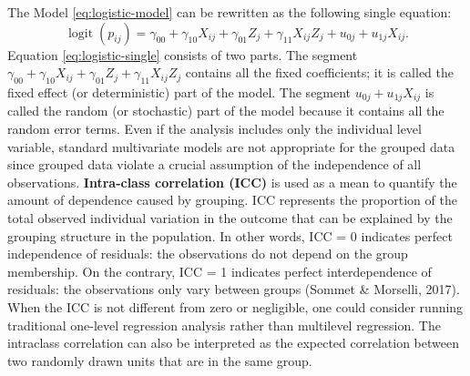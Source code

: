 \documentclass[12pt,oneside,a4paper]{reedthesis}
\begin{document}
The Model \eqref{eq:logistic-model} can be rewritten as the following single equation:
\begin{equation} 
\operatorname{logit}\left(p_{i j}\right)=\gamma_{00}+\gamma_{10} X_{i j}+\gamma_{01} Z_{j}+\gamma_{11} X_{i j} Z_{j}+u_{0 j}+u_{1 j} X_{i j}.
\label{eq:logistic-single}
\end{equation}
Equation \eqref{eq:logistic-single} consists of two parts. The segment \(\gamma_{00}+\gamma_{10} X_{i j}+\gamma_{01} Z_{j}+\gamma_{11} X_{i j} Z_{j}\) contains all the fixed coefficients; it is called the fixed effect (or deterministic) part of the model. The segment \(u_{0 j}+u_{1 j} X_{i j}\) is called the random (or stochastic) part of the model because it contains all the random error terms.
Even if the analysis includes only the individual level variable, standard multivariate models are not appropriate for the grouped data since grouped data violate a crucial assumption of the independence of all observations. \textbf{Intra-class correlation (ICC)} is used as a mean to quantify the amount of dependence caused by grouping. ICC represents the proportion of the total observed individual variation in the outcome that can be explained by the grouping structure in the population. In other words, ICC = 0 indicates perfect independence of residuals: the observations do not depend on the group membership. On the contrary, ICC = 1 indicates perfect interdependence of residuals: the observations only vary between groups (Sommet \& Morselli, 2017). When the ICC is not different from zero or negligible, one could consider running traditional one-level regression analysis rather than multilevel regression. The intraclass correlation can also be interpreted as the expected correlation between two randomly drawn units that are in the same group.
\end{document}
